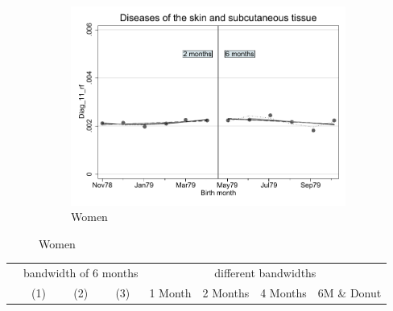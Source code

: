 \documentclass[a4paper ]{article}
\begin{document}
\begin{figure}[h]
\begin{subfigure}[t]{0.31\textwidth}
		\centering
		\includegraphics[width=0.99\textwidth]{R1_RD_Diag_11_rf_fits}
		\caption{Women}
	\end{subfigure}
\end{figure}


\begin{table}[h]\centering
\def\sym#1{\ifmmode^{#1}\else\(^{#1}\)\fi}
\begin{tabular}{l*{3}{c}|cccc}
\toprule
&\multicolumn{3}{c}{bandwidth of 6 months} & \multicolumn{4}{c}{different bandwidths} \\
 \cmidrule(lr{1em}){2-4} \cmidrule(lr{1em}){5-8}
 &\multicolumn{1}{c}{(1)}&\multicolumn{1}{c}{(2)}&\multicolumn{1}{c}{(3)}& 1 Month & 2 Months & 4 Months & 6M \& Donut \\
\midrule 

\bottomrule
\end{tabular}
\end{table}
\end{document}

